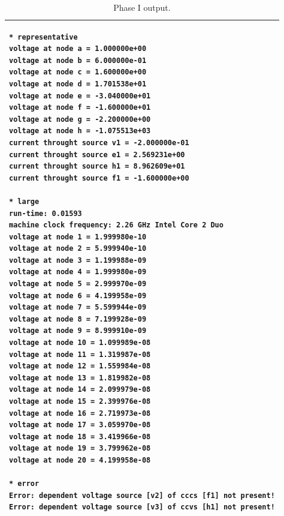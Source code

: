 \documentclass{article}
\begin{document}

\begin{table}[h]
  \centering
\begin{tabular}{|p{\linewidth}|}
\hline
\begin{verbatim}
* representative
voltage at node a = 1.000000e+00
voltage at node b = 6.000000e-01
voltage at node c = 1.600000e+00
voltage at node d = 1.701538e+01
voltage at node e = -3.040000e+01
voltage at node f = -1.600000e+01
voltage at node g = -2.200000e+00
voltage at node h = -1.075513e+03
current throught source v1 = -2.000000e-01
current throught source e1 = 2.569231e+00
current throught source h1 = 8.962609e+01
current throught source f1 = -1.600000e+00

* large
run-time: 0.01593
machine clock frequency: 2.26 GHz Intel Core 2 Duo
voltage at node 1 = 1.999980e-10
voltage at node 2 = 5.999940e-10
voltage at node 3 = 1.199988e-09
voltage at node 4 = 1.999980e-09
voltage at node 5 = 2.999970e-09
voltage at node 6 = 4.199958e-09
voltage at node 7 = 5.599944e-09
voltage at node 8 = 7.199928e-09
voltage at node 9 = 8.999910e-09
voltage at node 10 = 1.099989e-08
voltage at node 11 = 1.319987e-08
voltage at node 12 = 1.559984e-08
voltage at node 13 = 1.819982e-08
voltage at node 14 = 2.099979e-08
voltage at node 15 = 2.399976e-08
voltage at node 16 = 2.719973e-08
voltage at node 17 = 3.059970e-08
voltage at node 18 = 3.419966e-08
voltage at node 19 = 3.799962e-08
voltage at node 20 = 4.199958e-08

* error
Error: dependent voltage source [v2] of cccs [f1] not present!
Error: dependent voltage source [v3] of ccvs [h1] not present!
\end{verbatim}\\
\hline
\end{tabular}
  \caption{Phase I output.}
  \label{tab:phase1}
\end{table}
\end{document}
